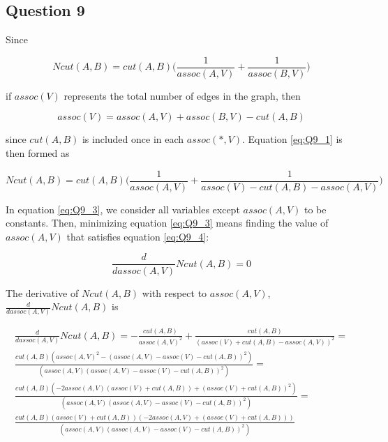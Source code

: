 \subsection{Question 9}

Since

\begin{equation}
  Ncut(A,B) = cut(A,B) \Big (\frac{1}{assoc(A,V)} + \frac{1}{assoc(B,V)} \Big)
  \label{eq:Q9_1}
\end{equation}

if $assoc(V)$ represents the total number of edges in the graph, then

\begin{equation}
  assoc(V) = assoc(A,V) + assoc(B,V) - cut(A,B)
  \label{eq:Q9_2}
\end{equation}

since $cut(A,B)$ is included once in each $assoc(*,V)$. Equation \ref{eq:Q9_1}
is then formed as

\begin{equation}
  Ncut(A,B) = cut(A,B) \Big (\frac{1}{assoc(A,V)} + \frac{1}{assoc(V) - cut(A,B) - assoc(A,V)} \Big)
  \label{eq:Q9_3}
\end{equation}

In equation \ref{eq:Q9_3}, we consider all variables except $assoc(A,V)$ to be
constants. Then, minimizing equation \ref{eq:Q9_3} means finding the value of
$assoc(A,V)$ that satisfies equation \ref{eq:Q9_4}:

\begin{equation}
  \frac{d}{dassoc(A,V)}Ncut(A,B) = 0
  \label{eq:Q9_4}
\end{equation}

The derivative of $Ncut(A,B)$ with respect to $assoc(A,V)$,
$\frac{d}{dassoc(A,V)}Ncut(A,B)$ is


\begin{multline}
  \frac{d}{dassoc(A,V)}Ncut(A,B) = -\frac{cut(A,B)}{assoc(A,V)^2} +
  \frac{cut(A,B)}{(assoc(V) + cut(A,B) - assoc(A,V))^2} = \\
  \frac{cut(A,B)(assoc(A,V)^2 - (assoc(A,V) - assoc(V) - cut(A,B))^2)}{(assoc(A,V)(assoc(A,V) - assoc(V) - cut(A,B))^2)} = \\
  \frac{cut(A,B)(-2assoc(A,V)(assoc(V) + cut(A,B)) + (assoc(V) + cut(A,B))^2)}{(assoc(A,V)(assoc(A,V) - assoc(V) - cut(A,B))^2)} = \\
  \frac{cut(A,B)(assoc(V) + cut(A,B))(-2assoc(A,V) + (assoc(V) + cut(A,B)))}{(assoc(A,V)(assoc(A,V) - assoc(V) - cut(A,B))^2)}
\end{multline}

